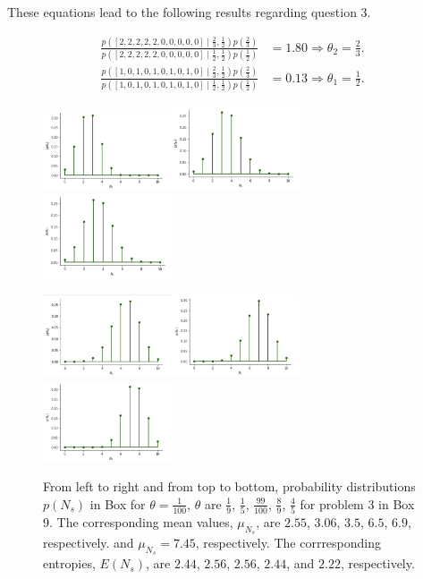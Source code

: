 \documentclass{tufte-handout}
\begin{document}
These equations lead to the following results regarding question 3.

\begin{align*}
\frac{p([2, 2, 2, 2, 2, 0, 0, 0, 0, 0]\mid \frac{2}{3}, \frac{1}{2})p(\frac{2}{3})}{p([2, 2, 2, 2, 2, 0, 0, 0, 0, 0]\mid  \frac{1}{2}, \frac{1}{2})p(\frac{1}{2})} &= 1.80 \Longrightarrow  \theta_2 = \frac{2}{3}.\\
\frac{p([1,0,1,0,1,0,1,0,1,0]\mid \frac{2}{3}, \frac{1}{2})p(\frac{2}{3})}{p([1,0,1,0,1,0,1,0,1,0]\mid  \frac{1}{2}, \frac{1}{2})p(\frac{1}{2})} &= 0.13 \Longrightarrow  \theta_1 = \frac{1}{2}. 
\end{align*}

\begin{figure}
\centering
\includegraphics[width=3.8cm]{fig/1-99.100.png}\includegraphics[width=3.8cm]{fig/1-8.9.png}\includegraphics[width=3.8cm]{fig/1-4.5.png}

\includegraphics[width=3.8cm]{fig/4.5.png}\includegraphics[width=3.8cm]{fig/8.9.png}\includegraphics[width=3.8cm]{fig/99.100.png}
\caption{From left to right and from top to bottom, probability distributions $p(N_s)$ in Box for $\theta= \frac{1}{100}$,  $\theta$ are $\frac{1}{9}$, $ \frac{1}{5}$, $ \frac{99}{100}$,  $\frac{8}{9}$, $\frac{4}{5}$ for problem 3 in Box 9. The corresponding mean values, $\mu_{N_s}$, are $2.55$, $3.06$, $3.5$, $6.5$, $6.9$, respectively.
and $\mu_{N_s}=7.45$, respectively. The corrresponding entropies, $E(N_s)$, are $2.44$,  $2.56$,  $2.56$,  $2.44$, and  $2.22$, respectively. 
}
\end{figure}
\end{document}
